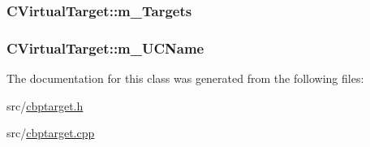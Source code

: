 \hypertarget{classCVirtualTarget_aeccb137f412bbc5ece8a63b8a186b205}{
\subsubsection[{m\-\_\-\-Targets}]{ C\-Virtual\-Target\-::m\-\_\-\-Targets\hspace{0.3cm}{\ttfamily [private]}}}\label{classCVirtualTarget_aeccb137f412bbc5ece8a63b8a186b205}
\hypertarget{classCVirtualTarget_a78fb1840fab5a6f227e2d45e5e0c58a8}{
\subsubsection[{m\-\_\-\-U\-C\-Name}]{ C\-Virtual\-Target\-::m\-\_\-\-U\-C\-Name\hspace{0.3cm}{\ttfamily [private]}}}\label{classCVirtualTarget_a78fb1840fab5a6f227e2d45e5e0c58a8}


The documentation for this class was generated from the following files\-:\begin{DoxyCompactItemize}
\item 
src/\hyperlink{cbptarget_8h}{cbptarget.\-h}\item 
src/\hyperlink{cbptarget_8cpp}{cbptarget.\-cpp}\end{DoxyCompactItemize}
